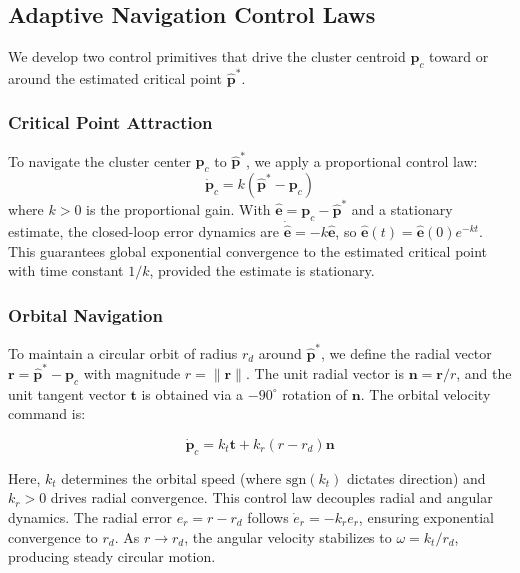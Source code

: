 \documentclass[lettersize,journal]{IEEEtran}
\begin{document}
\subsection{Adaptive Navigation Control Laws}
\label{sec:control_primitives}

We develop two control primitives that drive the cluster centroid $\mathbf{p}_c$ toward or around the estimated critical point $\hat{\mathbf{p}}^*$.

\subsubsection{Critical Point Attraction}
To navigate the cluster center $\mathbf{p}_c$ to $\hat{\mathbf{p}}^*$, we apply a proportional control law:
\begin{equation}\label{eq:10}
\dot{\mathbf{p}}_c = k(\hat{\mathbf{p}}^* - \mathbf{p}_c)
\end{equation}
where $k > 0$ is the proportional gain. With $\hat{\mathbf{e}} = \mathbf{p}_c - \hat{\mathbf{p}}^*$ and a stationary estimate, the closed-loop error dynamics are $\dot{\hat{\mathbf{e}}} = -k\hat{\mathbf{e}}$, so $\hat{\mathbf{e}}(t) = \hat{\mathbf{e}}(0)e^{-kt}$. This guarantees global exponential convergence to the estimated critical point with time constant $1/k$, provided the estimate is stationary.

\subsubsection{Orbital Navigation}
To maintain a circular orbit of radius $r_d$ around $\hat{\mathbf{p}}^*$, we define the radial vector $\mathbf{r} = \hat{\mathbf{p}}^* - \mathbf{p}_c$ with magnitude $r = \|\mathbf{r}\|$. The unit radial vector is $\mathbf{n} = \mathbf{r}/r$, and the unit tangent vector $\mathbf{t}$ is obtained via a $-90^\circ$ rotation of $\mathbf{n}$. The orbital velocity command is:

\begin{equation}\label{eq:11}
\dot{\mathbf{p}}_c = k_t \mathbf{t} + k_r(r - r_d)\mathbf{n}
\end{equation}

Here, $k_t$ determines the orbital speed (where $\text{sgn}(k_t)$ dictates direction) and $k_r > 0$ drives radial convergence.
This control law decouples radial and angular dynamics. The radial error $e_r = r - r_d$ follows $\dot{e}_r = -k_r e_r$, ensuring exponential convergence to $r_d$. As $r \to r_d$, the angular velocity stabilizes to $\omega = k_t/r_d$, producing steady circular motion.
\end{document}
